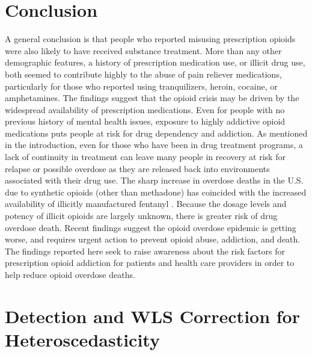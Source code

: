 \documentclass[sigconf]{acmart}
\begin{document}
\section{Conclusion}

A general conclusion is that people who reported misusing prescription opioids 
were also likely to have received substance treatment. More than any other 
demographic features, a history of prescription medication use, or illicit drug 
use, both seemed to contribute highly to the abuse of pain reliever medications, 
particularly for those who reported using tranquilizers, heroin, cocaine, or 
amphetamines. The findings suggest that the opioid crisis may be driven by the 
widespread availability of prescription medications. Even for people with no 
previous history of mental health issues, exposure to highly addictive opioid 
medications puts people at risk for drug dependency and addiction. As mentioned 
in the introduction, even for those who have been in drug treatment programs, 
a lack of continuity in treatment can leave many people in recovery at risk 
for relapse or possible overdose as they are released back into environments 
associated with their drug use. The sharp increase in overdose deaths in the 
U.S. due to synthetic opioids (other than methadone) has coincided with the 
increased availability of illicitly manufactured fentanyl \cite{nida17}. 
Because the dosage levels and potency of illicit opioids are largely unknown, 
there is greater risk of drug overdose death. Recent findings suggest the 
opioid overdose epidemic is getting worse, and requires urgent action to prevent 
opioid abuse, addiction, and death. The findings reported here seek to raise 
awareness about the risk factors for prescription opioid addiction for patients 
and health care providers in order to help reduce opioid overdose deaths. 


\appendix

\section{Detection and WLS Correction for Heteroscedasticity}
\end{document}
